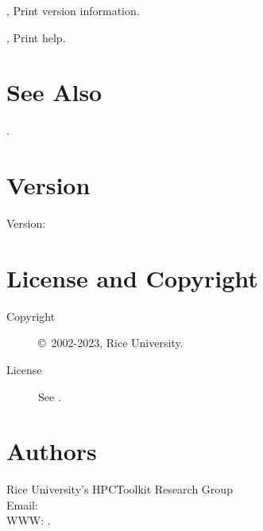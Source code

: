\documentclass[english]{article}
\begin{document}
\begin{Description}
\item[\Opt{-V}, \Opt{--version}] Print version information.
\item[\Opt{-h}, \Opt{--help}] Print help.
\end{Description}


\section{See Also}

.

\section{Version}

Version: \Version

\section{License and Copyright}

\begin{description}
\item[Copyright] \copyright\ 2002-2023, Rice University.
\item[License] See .
\end{description}

\section{Authors}

\noindent
Rice University's HPCToolkit Research Group \\
Email:  \\
WWW: .

\LatexManEnd
\end{document}
